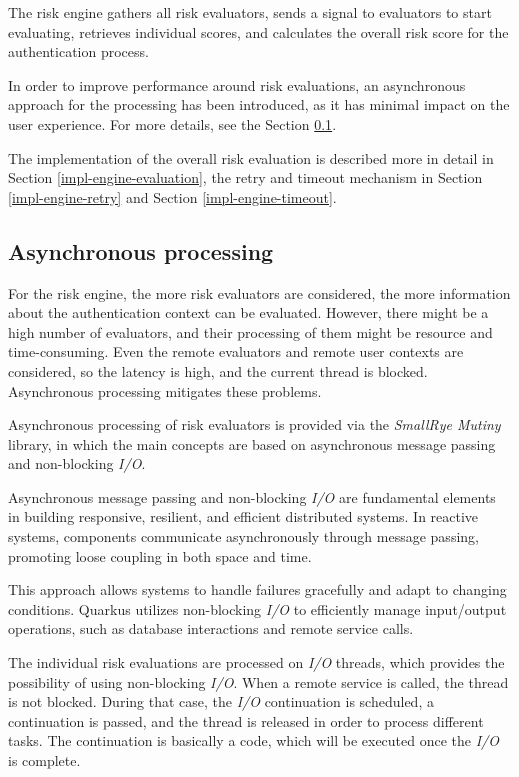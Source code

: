 The risk engine gathers all risk evaluators, sends a signal to evaluators to start evaluating, retrieves individual scores, and calculates the overall risk score for the authentication process.

In order to improve performance around risk evaluations, an asynchronous approach for the processing has been introduced, as it has minimal impact on the user experience.
For more details, see the Section \ref{impl-engine-async}.

The implementation of the overall risk evaluation is described more in detail in Section \ref{impl-engine-evaluation}, the retry and timeout mechanism in Section \ref{impl-engine-retry} and Section \ref{impl-engine-timeout}.

\subsection{Asynchronous processing} \label{impl-engine-async}
For the risk engine, the more risk evaluators are considered, the more information about the authentication context can be evaluated.
However, there might be a high number of evaluators, and their processing of them might be resource and time-consuming.
Even the remote evaluators and remote user contexts are considered, so the latency is high, and the current thread is blocked.
Asynchronous processing mitigates these problems.

Asynchronous processing of risk evaluators is provided via the \textit{SmallRye Mutiny} library, in which the main concepts are based on asynchronous message passing and non-blocking \textit{I/O}.

Asynchronous message passing and non-blocking \textit{I/O} are fundamental elements in building responsive, resilient, and efficient distributed systems.
In reactive systems, components communicate asynchronously through message passing, promoting loose coupling in both space and time.

This approach allows systems to handle failures gracefully and adapt to changing conditions.
Quarkus utilizes non-blocking \textit{I/O} to efficiently manage input/output operations, such as database interactions and remote service calls. \cite{quarkus-reactive}

The individual risk evaluations are processed on \textit{I/O} threads, which provides the possibility of using non-blocking \textit{I/O}.
When a remote service is called, the thread is not blocked.
During that case, the \textit{I/O} continuation is scheduled, a continuation is passed, and the thread is released in order to process different tasks.
The continuation is basically a code, which will be executed once the \textit{I/O} is complete.\cite{quarkus-reactive}

